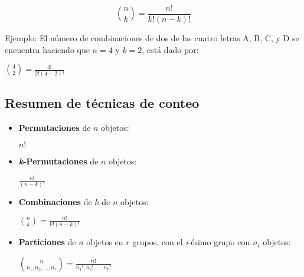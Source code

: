 \begin{equation}
	\binom{n}{k} = \frac{n!}{k!(n-k)!}
\end{equation}

Ejemplo: El n\'umero de combinaciones de dos de las cuatro letras A, B, C, y D
se encuentra haciendo que $n = 4$ y $ k = 2$, está dado por:

\begin{center}
	$\binom{4}{2} = \frac{4!}{2!(4-2)!}$
\end{center}






\subsection{Resumen de técnicas de conteo}

\begin{tcolorbox}[colback=blue!5!white,colframe=blue!60!black,title=Resumen: Técnicas de conteo]

	\begin{itemize}
		\item \textbf{Permutaciones} de $n$ objetos:
		\begin{center}
		$n!$
		\end{center}

		\item \textbf{\textit{k}-Permutaciones} de $n$ objetos:
		\begin{center}
		$\frac{n!}{(n-k)!}$
		\end{center}

		\item \textbf{Combinaciones} de $k$ de $n$ objetos:
		\begin{center}
		$\binom{n}{k} = \frac{n!}{k!(n-k)!}$
		\end{center}

		\item \textbf{Particiones} de $n$ objetos en $r$ grupos, con el \textit{i}-ésimo
		grupo con $n_i$ objetos:
		\begin{center}
			$\binom{n}{n_1,n_2,...,n_r} = \frac{n!}{n_1!,n_2!,...,n_r!}$
		\end{center}

	\end{itemize}
	
\end{tcolorbox}
